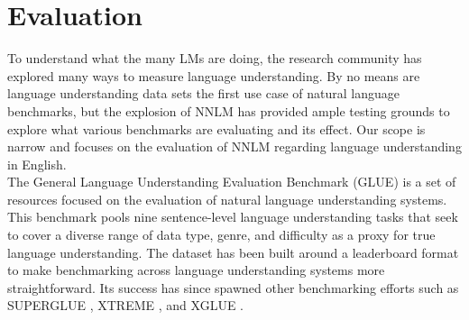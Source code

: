 \section{Evaluation}
\label{chap:prior:sec:eval}
To understand what the many LMs are doing, the research community has explored many ways to measure language understanding. By no means are language understanding data sets the first use case of natural language benchmarks, but the explosion of NNLM has provided ample testing grounds to explore what various benchmarks are evaluating and its effect. Our scope is narrow and focuses on the evaluation of NNLM regarding language understanding in English. \\
The General Language Understanding Evaluation Benchmark (GLUE) \cite{Wang2018GLUEAM} is a set of resources focused on the evaluation of natural language understanding systems. This benchmark pools nine sentence-level language understanding tasks that seek to cover a diverse range of data type, genre, and difficulty as a proxy for true language understanding. The dataset has been built around a leaderboard format to make benchmarking across language understanding systems more straightforward. Its success has since spawned other benchmarking efforts such as SUPERGLUE \cite{Wang2019SuperGLUEAS}, XTREME \cite{Hu2020XTREMEAM}, and XGLUE \cite{Liang2020XGLUEAN}. \\
